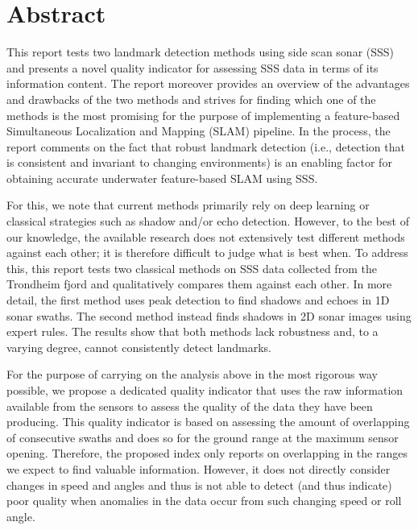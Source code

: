 \chapter*{Abstract}

This report tests two landmark detection methods using side scan sonar (SSS) and presents a novel quality indicator for assessing SSS data in terms of its information content. The report moreover provides an overview of the advantages and drawbacks of the two methods and strives for finding which one of the methods is the most promising for the purpose of implementing a feature-based Simultaneous Localization and Mapping (SLAM) pipeline. In the process, the report comments on the fact that robust landmark detection (i.e., detection that is consistent and invariant to changing environments) is an enabling factor for obtaining accurate underwater feature-based SLAM using SSS. 

For this, we note that current methods primarily rely on deep learning or classical strategies such as shadow and/or echo detection. However, to the best of our knowledge, the available research does not extensively test different methods against each other; it is therefore difficult to judge what is best when. To address this, this report tests two classical methods on SSS data collected from the Trondheim fjord and qualitatively compares them against each other. In more detail, the first method uses peak detection to find shadows and echoes in 1D sonar swaths. The second method instead finds shadows in 2D sonar images using expert rules. The results show that both methods lack robustness and, to a varying degree, cannot consistently detect landmarks.

For the purpose of carrying on the analysis above in the most rigorous way possible, we propose a dedicated quality indicator that uses the raw information available from the sensors to assess the quality of the data they have been producing. This quality indicator is based on assessing the amount of overlapping of consecutive swaths and does so for the ground range at the maximum sensor opening. Therefore, the proposed index only reports on overlapping in the ranges we expect to find valuable information. However, it does not directly consider changes in speed and angles and thus is not able to detect (and thus indicate) poor quality when anomalies in the data occur from such changing speed or roll angle. 
